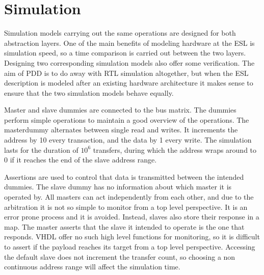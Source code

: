 \section{Simulation}
\label{sec:sim}
Simulation models carrying out the same operations are designed for both abstraction layers. One of the main benefits of modeling hardware at the ESL is simulation speed, so a time comparison is carried out between the two layers. Designing two corresponding simulation models also offer some verification. 
The aim of PDD is to do away with RTL simulation altogether, but when the ESL description is modeled after an existing hardware architecture it makes sense
to ensure that the two simulation models behave equally. \par
Master and slave dummies are connected to the bus matrix. The dummies perform simple operations to maintain a good overview of the operations. 
The masterdummy alternates between single read and writes. It increments the address by 10 every transaction, and the data by 1 every write. 
The simulation lasts for the duration of $10^6$ transfers, during which the address wraps around to 0 if it reaches the end of the slave address range. \par
Assertions are used to control that data is transmitted between the intended dummies. The slave dummy has no information about which master it is operated by. 
All masters can act independently from each other, and due to the arbitration it is not so simple to monitor from a top level perspective. It is an error prone
process and it is avoided. Instead, slaves also store their response in a map. The master asserts that the slave it intended to operate is the one that responds. VHDL offer no such high level functions for monitoring, so it is difficult to assert if the payload reaches its target from a top level perspective.
Accessing the default slave does not increment the transfer count, so choosing a non continuous address range will affect the simulation time.  

